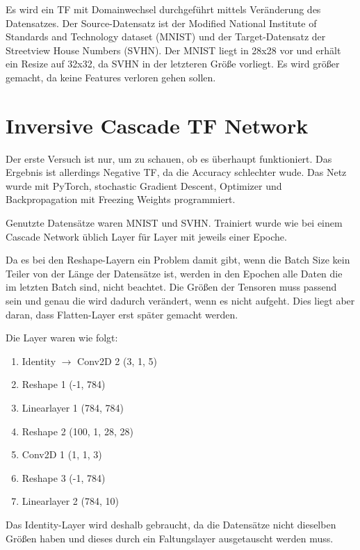     Es wird ein TF mit Domainwechsel durchgeführt mittels Veränderung des 
    Datensatzes. Der Source-Datensatz ist der Modified National Institute 
    of Standards and Technology dataset (MNIST) und der Target-Datensatz 
    der Streetview House Numbers (SVHN). Der MNIST liegt in 28x28 vor und 
    erhält ein Resize auf 32x32, da SVHN in der letzteren Größe vorliegt. 
    Es wird größer gemacht, da keine Features verloren gehen sollen.

\section{Inversive Cascade TF Network}

    Der erste Versuch ist nur, um zu schauen, ob es überhaupt funktioniert. 
    Das Ergebnis ist allerdings Negative TF, da die Accuracy schlechter wude. 
    Das Netz wurde mit PyTorch, stochastic Gradient Descent, Optimizer und 
    Backpropagation mit Freezing Weights programmiert. 

    Genutzte Datensätze waren MNIST und SVHN. Trainiert wurde wie bei einem 
    Cascade Network üblich Layer für Layer mit jeweils einer Epoche.

    Da es bei den Reshape-Layern ein Problem damit gibt, wenn die Batch Size kein Teiler 
    von der Länge der Datensätze ist, werden in den Epochen alle Daten die im letzten Batch 
    sind, nicht beachtet. Die Größen der Tensoren muss passend sein und genau die wird 
    dadurch verändert, wenn es nicht aufgeht. Dies liegt aber daran, dass Flatten-Layer 
    erst später gemacht werden.

    Die Layer waren wie folgt: 
    \begin{enumerate}
        \item Identity $\rightarrow$ Conv2D 2 (3, 1, 5)
        \item Reshape 1 (-1, 784)
        \item Linearlayer 1 (784, 784)
        \item Reshape 2 (100, 1, 28, 28)
        \item Conv2D 1 (1, 1, 3)
        \item Reshape 3 (-1, 784)
        \item Linearlayer 2 (784, 10)
    \end{enumerate}

    Das Identity-Layer wird deshalb gebraucht, da die Datensätze nicht 
    dieselben Größen haben und dieses durch ein Faltungslayer ausgetauscht 
    werden muss.

